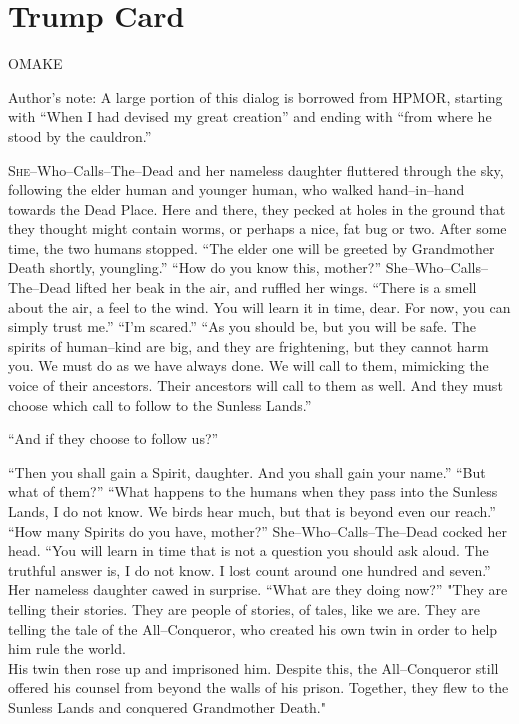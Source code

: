 \chapter*{Trump Card}
\begin{center} \chapnumfont OMAKE \end{center}
\SomeVSpace
\SomeVSpace
\SomeVSpace
\small Author’s note:
A large portion of this dialog is borrowed from HPMOR, starting with “When I had devised my great creation{\el}” and ending with “{\el}from where he stood by the cauldron.” \normalsize
\simpleline
{}

\lettrine{S}{he}\mbox{--}Who\mbox{--}Calls\mbox{--}The\mbox{--}Dead and her nameless daughter fluttered through the sky, following the elder human and younger human, who walked hand\mbox{--}in\mbox{--}hand towards the Dead Place. Here and there, they pecked at holes in the ground that they thought might contain worms, or perhaps a nice, fat bug or two. After some time, the two humans stopped.
\SmallVSpace
“The elder one will be greeted by Grandmother Death shortly, youngling.”
\SmallVSpace
“How do you know this, mother?”
\SmallVSpace
She\mbox{--}Who\mbox{--}Calls\mbox{--}The\mbox{--}Dead lifted her beak in the air, and ruffled her wings. “There is a smell about the air, a feel to the wind. You will learn it in time, dear. For now, you can simply trust me.”
\SmallVSpace
“I’m scared.”
\SmallVSpace
“As you should be, but you will be safe. The spirits of human\mbox{--}kind are big, and they are frightening, but they cannot harm you. We must do as we have always done. We will call to them, mimicking the voice of their ancestors. Their ancestors will call to them as well. And they must choose which call to follow to the Sunless Lands.”

“And if they choose to follow us?”

“Then you shall gain a Spirit, daughter. And you shall gain your name.”
\SmallVSpace
“But what of them?”
\SmallVSpace
“What happens to the humans when they pass into the Sunless Lands, I do not know. We birds hear much, but that is beyond even our reach.”
\SmallVSpace
“How many Spirits do you have, mother?”
\SmallVSpace
She\mbox{--}Who\mbox{--}Calls\mbox{--}The\mbox{--}Dead cocked her head. “You will learn in time that is not a question you should ask aloud. The truthful answer is, I do not know. I lost count around one hundred and seven.”
\SmallVSpace
Her nameless daughter cawed in surprise. “What are they doing now?”
\SmallVSpace
"They are telling their stories. They are people of stories, of tales, like we are. They are telling the tale of the All\mbox{--}Conqueror, who created his own twin in order to help him rule the world.\\His twin then rose up and imprisoned him. Despite this, the All\mbox{--}Conqueror still offered his counsel from beyond the walls of his prison. Together, they flew to the Sunless Lands and conquered Grandmother Death."

